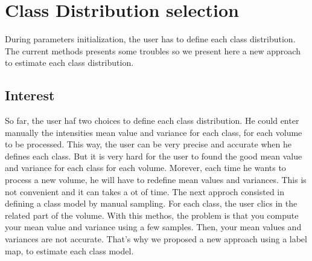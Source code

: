 \section{Class Distribution selection}\label{sec:CDS}
%
During parameters initialization, the user has to define each class distribution. The current methods presents some troubles so we present here a new approach to estimate each class distribution.
%
\subsection{Interest}
%
So far, the user haf two choices to define each class distribution. He could enter manually the intensities mean value and variance for each class, for each volume to be processed. This way, the user can be very precise and accurate when he defines each class. But it is very hard for the user to found the good mean value and variance for each class for each volume. Morever, each time he wants to process a new volume, he will have to redefine mean values and variances. This is not convenient and it can takes a ot of time. The next approch consisted in defining a class model by manual sampling. For each class, the user clics in the related part of the volume. With this methos, the problem is that you compute your mean value and variance using a few samples. Then, your mean values and variances are not accurate. That's why we proposed a new approach using a label map, to estimate each class model.
%
